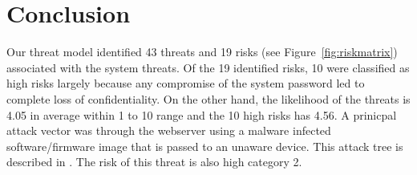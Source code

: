 \chapter{Conclusion}
\label{ch:conclusion}


Our threat model identified 43 threats and 19 risks (see
Figure~\ref{fig:riskmatrix}) associated with the system threats. Of
the 19 identified risks, 10 were classified as high risks largely
because any compromise of the system password led to complete loss of
confidentiality.  On the other hand, the likelihood of the threats is
4.05 in average within 1 to 10 range and the 10 high risks has 4.56. A
prinicpal attack vector was through the webserver using a malware
infected software/firmware image that is passed to an unaware
device. This attack tree is described in . The risk of
this threat is also high category 2.

